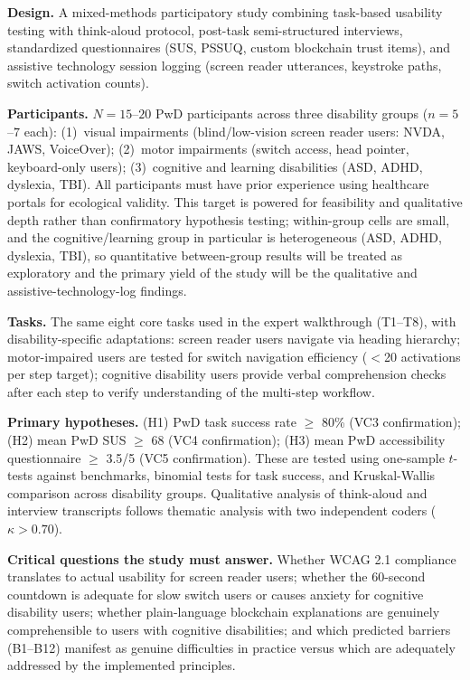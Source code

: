 \documentclass[journal,onecolumn]{IEEEtran}
\begin{document}
\textbf{Design.} A mixed-methods participatory study combining task-based usability testing with think-aloud protocol, post-task semi-structured interviews, standardized questionnaires (SUS, PSSUQ, custom blockchain trust items), and assistive technology session logging (screen reader utterances, keystroke paths, switch activation counts).

\textbf{Participants.} $N = 15$--$20$ PwD participants across three disability groups ($n = 5$--$7$ each): (1)~visual impairments (blind/low-vision screen reader users: NVDA, JAWS, VoiceOver); (2)~motor impairments (switch access, head pointer, keyboard-only users); (3)~cognitive and learning disabilities (ASD, ADHD, dyslexia, TBI). All participants must have prior experience using healthcare portals for ecological validity. This target is powered for feasibility and qualitative depth rather than confirmatory hypothesis testing; within-group cells are small, and the cognitive/learning group in particular is heterogeneous (ASD, ADHD, dyslexia, TBI), so quantitative between-group results will be treated as exploratory and the primary yield of the study will be the qualitative and assistive-technology-log findings.

\textbf{Tasks.} The same eight core tasks used in the expert walkthrough (T1--T8), with disability-specific adaptations: screen reader users navigate via heading hierarchy; motor-impaired users are tested for switch navigation efficiency ($<$20 activations per step target); cognitive disability users provide verbal comprehension checks after each step to verify understanding of the multi-step workflow.

\textbf{Primary hypotheses.} (H1) PwD task success rate $\geq$ 80\% (VC3 confirmation); (H2) mean PwD SUS $\geq$ 68 (VC4 confirmation); (H3) mean PwD accessibility questionnaire $\geq$ 3.5/5 (VC5 confirmation). These are tested using one-sample $t$-tests against benchmarks, binomial tests for task success, and Kruskal-Wallis comparison across disability groups. Qualitative analysis of think-aloud and interview transcripts follows thematic analysis \cite{braun2006using} with two independent coders ($\kappa > 0.70$).

\textbf{Critical questions the study must answer.} Whether WCAG 2.1 compliance translates to actual usability for screen reader users; whether the 60-second countdown is adequate for slow switch users or causes anxiety for cognitive disability users; whether plain-language blockchain explanations are genuinely comprehensible to users with cognitive disabilities; and which predicted barriers (B1--B12) manifest as genuine difficulties in practice versus which are adequately addressed by the implemented principles.
\end{document}
